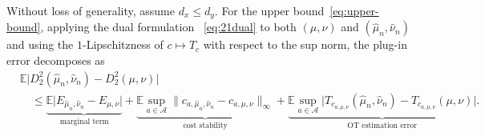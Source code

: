 \documentclass[11pt]{amsart}
\theoremstyle{definition}
\theoremstyle{remark}
\newcommand{\E}{\mathbb{E}}
\newcommand{\1}{\mathbf{1}}
\numberwithin{equation}{section}
\begin{document}
Without loss of generality, assume
$d_x\leq d_y$. For the upper bound~\eqref{eq:upper-bound},
applying the dual formulation ~\eqref{eq:21dual} to both $(\mu,\nu)$ and
$(\widehat\mu_n,\widehat\nu_n)$ and using the $1$-Lipschitzness of
$c\mapsto T_c$ with respect to the sup norm, the plug-in error decomposes as
\begin{equation}\label{eq:decomp}
\begin{aligned}
&\E\bigl|D_2^2(\widehat\mu_n,\widehat\nu_n)
  -D_2^2(\mu,\nu)\bigr| \\
&\quad\leq
\underbrace{\E\bigl|E_{\widehat\mu_n,\widehat\nu_n}
  -E_{\mu,\nu}\bigr|}_{\text{marginal term}}
+\underbrace{\E\sup_{a\in\mathcal A}
  \bigl\|c_{a,\widehat\mu_n,\widehat\nu_n}
  -c_{a,\mu,\nu}\bigr\|_\infty}_{\text{cost stability}}
+\underbrace{\E\sup_{a\in\mathcal A}
  \bigl|T_{c_{a,\mu,\nu}}(\widehat\mu_n,\widehat\nu_n)
  -T_{c_{a,\mu,\nu}}(\mu,\nu)\bigr|}_{\text{OT estimation error}}.
\end{aligned}
\end{equation}
\end{document}
